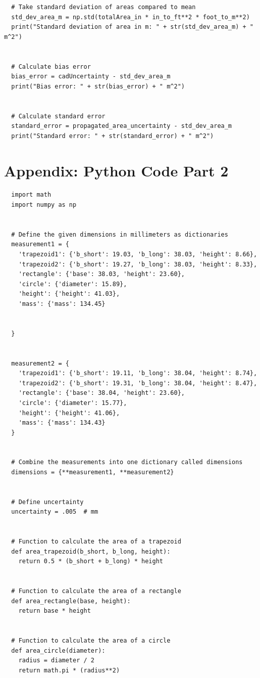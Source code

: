 \documentclass{article}
\begin{document}
\begin{appendices}
\begin{verbatim}
  # Take standard deviation of areas compared to mean
  std_dev_area_m = np.std(totalArea_in * in_to_ft**2 * foot_to_m**2)
  print("Standard deviation of area in m: " + str(std_dev_area_m) + " m^2")


  # Calculate bias error
  bias_error = cadUncertainty - std_dev_area_m
  print("Bias error: " + str(bias_error) + " m^2")


  # Calculate standard error
  standard_error = propagated_area_uncertainty - std_dev_area_m
  print("Standard error: " + str(standard_error) + " m^2")

\end{verbatim}


\newpage
\section*{Appendix: Python Code Part 2}

\begin{verbatim}
  import math
  import numpy as np


  # Define the given dimensions in millimeters as dictionaries
  measurement1 = {
  	'trapezoid1': {'b_short': 19.03, 'b_long': 38.03, 'height': 8.66},
  	'trapezoid2': {'b_short': 19.27, 'b_long': 38.03, 'height': 8.33},
  	'rectangle': {'base': 38.03, 'height': 23.60},
  	'circle': {'diameter': 15.89},
  	'height': {'height': 41.03},
  	'mass': {'mass': 134.45}


  }


  measurement2 = {
  	'trapezoid1': {'b_short': 19.11, 'b_long': 38.04, 'height': 8.74},
  	'trapezoid2': {'b_short': 19.31, 'b_long': 38.04, 'height': 8.47},
  	'rectangle': {'base': 38.04, 'height': 23.60},
  	'circle': {'diameter': 15.77},
  	'height': {'height': 41.06},
  	'mass': {'mass': 134.43}
  }


  # Combine the measurements into one dictionary called dimensions
  dimensions = {**measurement1, **measurement2}


  # Define uncertainty
  uncertainty = .005  # mm


  # Function to calculate the area of a trapezoid
  def area_trapezoid(b_short, b_long, height):
  	return 0.5 * (b_short + b_long) * height


  # Function to calculate the area of a rectangle
  def area_rectangle(base, height):
  	return base * height


  # Function to calculate the area of a circle
  def area_circle(diameter):
  	radius = diameter / 2
  	return math.pi * (radius**2)



\end{verbatim}
\end{appendices}
\end{document}
